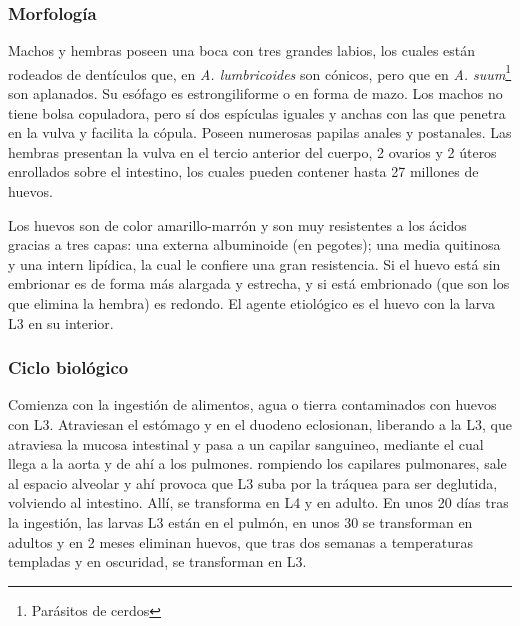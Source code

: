 \subsubsection{Morfología}
Machos y hembras poseen una boca con tres grandes labios, los cuales están rodeados de dentículos que, en \textit{A. lumbricoides} son cónicos, pero que en \textit{A. suum}\footnote{Parásitos de cerdos} son aplanados. Su esófago es estrongiliforme o en forma de mazo. Los machos no tiene bolsa copuladora, pero sí dos espículas iguales y anchas con las que penetra en la vulva y facilita la cópula. Poseen numerosas papilas anales y postanales. Las hembras presentan la vulva en el tercio anterior del cuerpo, 2 ovarios y 2 úteros enrollados sobre el intestino, los cuales pueden contener hasta 27 millones de huevos.

Los huevos son de color amarillo-marrón y son muy resistentes a los ácidos gracias a tres capas: una externa albuminoide (en pegotes); una media quitinosa y una intern lipídica, la cual le confiere una gran resistencia. Si el huevo está sin embrionar es de forma más alargada y estrecha, y si está embrionado (que son los que elimina la hembra) es redondo. El agente etiológico es el huevo con la larva L3 en su interior.
\subsubsection{Ciclo biológico}
Comienza con la ingestión de alimentos, agua o tierra contaminados con huevos con L3. Atraviesan el estómago y en el duodeno eclosionan, liberando a la L3, que atraviesa la mucosa intestinal y pasa a un capilar sanguineo, mediante el cual llega a la aorta y de ahí a los pulmones. rompiendo los capilares pulmonares, sale al espacio alveolar y ahí provoca que L3 suba por la tráquea para ser deglutida, volviendo al intestino. Allí, se transforma en L4 y en adulto. En unos 20 días tras la ingestión, las larvas L3 están en el pulmón, en unos 30 se transforman en adultos y en 2 meses eliminan huevos, que tras dos semanas a temperaturas templadas y en oscuridad, se transforman en L3.

